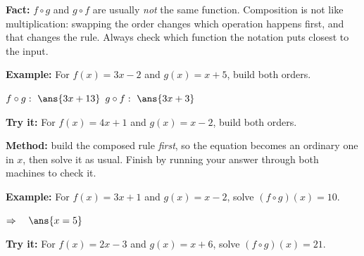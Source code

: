 \documentclass[12pt]{article}
\begin{document}

\begin{formulabox}
\textbf{Fact:} $f \circ g$ and $g \circ f$ are usually \emph{not} the same
function. Composition is not like multiplication: swapping the order changes
which operation happens first, and that changes the rule. Always check which
function the notation puts closest to the input.
\end{formulabox}

\begin{examplebox}
\textbf{Example:} \quad For $f(x) = 3x-2$ and $g(x) = x+5$, build both orders.

$f \circ g:\ \ans{3x + 13}$ \qquad $g \circ f:\ \ans{3x + 3}$
\end{examplebox}

\begin{tryitbox}
\textbf{Try it:} \quad For $f(x) = 4x+1$ and $g(x) = x-2$, build both
orders.\\[2pt]
\end{tryitbox}


\begin{formulabox}
\textbf{Method:} build the composed rule \emph{first}, so the equation becomes an
ordinary one in $x$, then solve it as usual. Finish by running your answer
through both machines to check it.
\end{formulabox}

\begin{examplebox}
\textbf{Example:} \quad For $f(x) = 3x+1$ and $g(x) = x-2$, solve
$(f \circ g)(x) = 10$.

$\Rightarrow\quad \ans{x = 5}$
\end{examplebox}

\begin{tryitbox}
\textbf{Try it:} \quad For $f(x) = 2x-3$ and $g(x) = x+6$, solve
$(f \circ g)(x) = 21$.\\[2pt]
\end{tryitbox}
\end{document}
